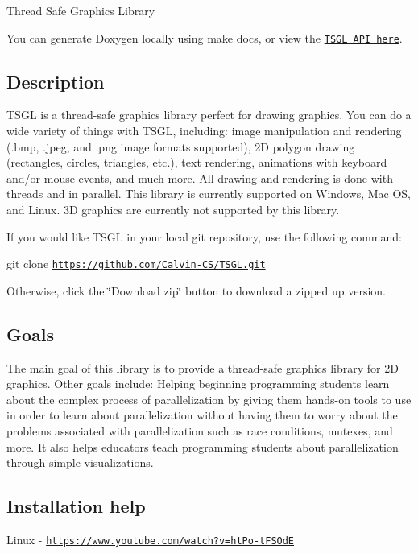 Thread Safe Graphics Library

You can generate Doxygen locally using \textquotesingle{}make docs\textquotesingle{}, or view the \href{http://calvin-cs.github.io/TSGL/html/index.html}{\tt T\+S\+G\+L A\+P\+I here}. 

 \subsection*{Description }

T\+S\+G\+L is a thread-\/safe graphics library perfect for drawing graphics. You can do a wide variety of things with T\+S\+G\+L, including\+: image manipulation and rendering (.bmp, .jpeg, and .png image formats supported), 2\+D polygon drawing (rectangles, circles, triangles, etc.), text rendering, animations with keyboard and/or mouse events, and much more. All drawing and rendering is done with threads and in parallel. This library is currently supported on Windows, Mac O\+S, and Linux. 3\+D graphics are currently not supported by this library.

If you would like T\+S\+G\+L in your local git repository, use the following command\+:

git clone \href{https://github.com/Calvin-CS/TSGL.git}{\tt https\+://github.\+com/\+Calvin-\/\+C\+S/\+T\+S\+G\+L.\+git}

Otherwise, click the \char`\"{}\+Download zip\char`\"{} button to download a zipped up version. 

 \subsection*{Goals }

The main goal of this library is to provide a thread-\/safe graphics library for 2\+D graphics. Other goals include\+: Helping beginning programming students learn about the complex process of parallelization by giving them hands-\/on tools to use in order to learn about parallelization without having them to worry about the problems associated with parallelization such as race conditions, mutexes, and more. It also helps educators teach programming students about parallelization through simple visualizations. 

 \subsection*{Installation help }

Linux -\/ \href{https://www.youtube.com/watch?v=htPo-tFSOdE}{\tt https\+://www.\+youtube.\+com/watch?v=ht\+Po-\/t\+F\+S\+Od\+E}

